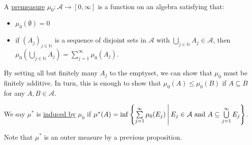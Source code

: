 \documentclass{book}
\newcommand{\teachComment}{
   \color{Orange}%
   \fontsize{12}{14}\selectfont%
}
\newenvironment{myTindent}{%
   \begin{adjustwidth}{7.5em}{0em}%
}{%
   \end{adjustwidth}%
}
\newcommand{\udefine}[1]{{%
   \setulcolor{Red}%
   \setul{0.14em}{0.07em}%
   \ul{#1}%
}}
\newcommand{\mySepTwo}[1][.]{%
   {\noindent\color{#1}{\rule{6.5in}{0.5mm}}}\\%
}
\newcommand{\retTwo}{\hfill\bigbreak}
\begin{document}
\mySepTwo

A \udefine{premeasure} $\mu_0 : \mathcal{A} \longrightarrow [0, \infty]$ is a function on an algebra satisfying that:
\begin{itemize}
   \item $\mu_0(\emptyset) = 0$
   \item if $(A_j)_{j \in \mathbb{N}}$ is a sequence of disjoint sets in $\mathcal{A}$ with $\bigcup\limits_{j \in \mathbb{N}}A_j \in \mathcal{A}$, then\\ [-14pt] $\mu_0(\bigcup\limits_{j \in \mathbb{N}}A_j) = \sum\limits_{j=1}^\infty \mu_0(A_j)$.
\end{itemize}


\begin{myTindent}\teachComment
   By setting all but finitely many $A_j$ to the emptyset, we can show that $\mu_0$ must be finitely additive. In turn, this is enough to show that $\mu_0(A) \leq \mu_0(B)$ if $A \subseteq B$ for any $A, B \in \mathcal{A}$.
\end{myTindent}

We say $\mu^*$ is \udefine{induced by} $\mu_0$ if $\mu^*(A) = \inf\left\{\sum\limits_{j = 1}^\infty \mu_0(E_j)\hspace{0.2em} \middle| \hspace{0.2em} E_j \in \mathcal{A} \text{ and } A \subseteq \bigcup\limits_{j = 1}^\infty E_j\right\}$.\retTwo

Note that $\mu^*$ is an outer measure by a previous proposition.\retTwo
\end{document}
